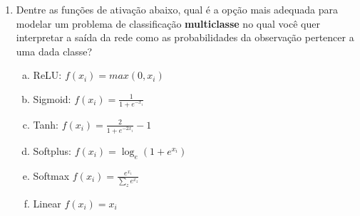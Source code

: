\documentclass{dlproblemset}
\begin{document}
\begin{enumerate}[1)]
\begin{enumerate}[(a)]
        \item $\mathbf{D}_{\text{Adam}} = \begin{bmatrix} 1 & 1 \\ 1 & 1 \end{bmatrix}$, \quad $\mathbf{D}_{\text{Muon}} = \begin{bmatrix} 0{,}6 & 0{,}2 \\ 0{,}55 & 0{,}6 \end{bmatrix}$
        \item $\mathbf{D}_{\text{Adam}} = \begin{bmatrix} 0{,}96 & -0{,}28 \\ 0{,}28 & 0{,}96 \end{bmatrix}$, \quad $\mathbf{D}_{\text{Muon}} = \begin{bmatrix} 1 & 1 \\ 1 & 1 \end{bmatrix}$
    \end{enumerate}

\subsection*{Funções de Custo e Funções de Ativação}

    \item Dentre as funções de ativação abaixo, qual é a opção mais adequada para modelar um problema de classificação \textbf{multiclasse} no qual você quer interpretar a saída da rede como as probabilidades da observação pertencer a uma dada classe?
    \begin{enumerate}[(a)]
        \item ReLU: $f(x_{i}) = max(0,x_{i})$
        \item Sigmoid: $f(x_{i}) = \frac{1}{1 + e^{-x_{i}}}$
        \item Tanh: $f(x_{i}) = \frac{2}{1 + e^{-2x_{i}}}-1$
        \item Softplus: $f(x_{i}) = \log_{e}(1 + e^{x_{i}})$
        \item Softmax $f(x_{i}) = \frac{e^{x_{i}}}{\sum_{z} e^{x_{z}}}$
        \item Linear $f(x_{i}) = x_{i}$
    \end{enumerate}


\end{enumerate}
\end{document}
